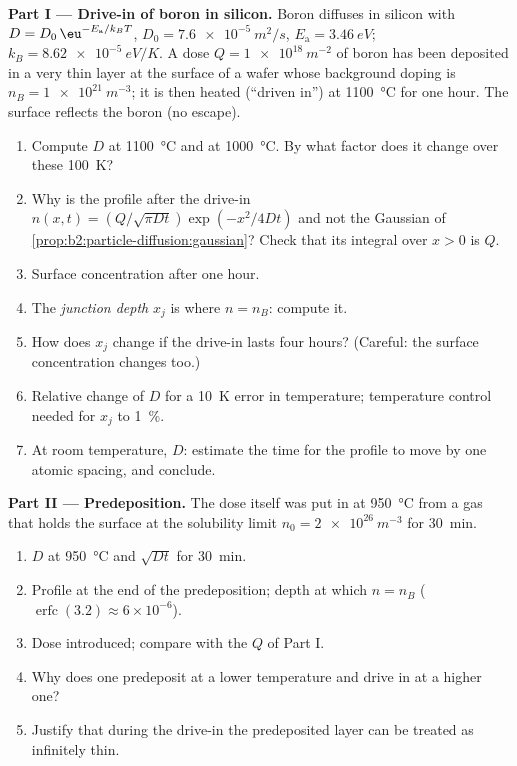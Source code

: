 \begin{problem}\label{pb:b2:particle-diffusion:1}
\textbf{Part I --- Drive-in of boron in silicon.}
Boron diffuses in silicon with $D = D_0\,\eu^{-E_{\text{a}}/k_BT}$, $D_0 =
\qty{7.6e-5}{m^2/s}$, $E_{\text{a}} = \qty{3.46}{eV}$; $k_B =
\qty{8.62e-5}{eV/K}$. A dose $Q = \qty{1e18}{m^{-2}}$ of boron has been
deposited in a very thin layer at the surface of a wafer whose
background doping is $n_B = \qty{1e21}{m^{-3}}$; it is then heated
(``driven in'') at \qty{1100}{\celsius} for one hour. The surface
reflects the boron (no escape).
\begin{enumerate}
  \item Compute $D$ at \qty{1100}{\celsius} and at \qty{1000}{\celsius}.
        By what factor does it change over these \qty{100}{K}?
  \item Why is the profile after the drive-in $n(x,t) = (Q/\sqrt{\pi
        Dt})\exp(-x^2/4Dt)$ and not the Gaussian of
        \cref{prop:b2:particle-diffusion:gaussian}? Check that its
        integral over $x > 0$ is $Q$.
  \item Surface concentration after one hour.
  \item The \emph{junction depth} $x_j$ is where $n = n_B$: compute it.
  \item How does $x_j$ change if the drive-in lasts four hours?
        (Careful: the surface concentration changes too.)
  \item Relative change of $D$ for a \qty{10}{K} error in temperature;
        temperature control needed for $x_j$ to \qty{1}{\%}.
  \item At room temperature, $D$: estimate the time for the profile to
        move by one atomic spacing, and conclude.
\end{enumerate}

\textbf{Part II --- Predeposition.}
The dose itself was put in at \qty{950}{\celsius} from a gas that holds
the surface at the solubility limit $n_0 = \qty{2e26}{m^{-3}}$ for
\qty{30}{min}.
\begin{enumerate}[resume]
  \item $D$ at \qty{950}{\celsius} and $\sqrt{Dt}$ for \qty{30}{min}.
  \item Profile at the end of the predeposition; depth at which $n =
        n_B$ ($\operatorname{erfc}(3.2) \approx 6 \times 10^{-6}$).
  \item Dose introduced; compare with the $Q$ of Part I.
  \item Why does one predeposit at a lower temperature and drive in at
        a higher one?
  \item Justify that during the drive-in the predeposited layer can be
        treated as infinitely thin.
\end{enumerate}


\end{problem}
